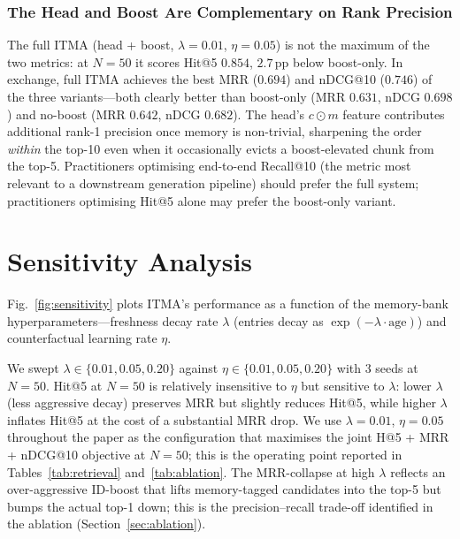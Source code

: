 \documentclass[journal]{IEEEtran}
\begin{document}
\subsubsection{The Head and Boost Are Complementary on Rank Precision}
The full ITMA (head + boost, $\lambda{=}0.01$, $\eta{=}0.05$) is not
the maximum of the two metrics: at $N{=}50$ it scores Hit@5 $0.854$,
$2.7$\,pp below boost-only.  In exchange, full ITMA achieves the best
MRR ($0.694$) and nDCG@10 ($0.746$) of the three variants---both
clearly better than boost-only (MRR $0.631$, nDCG $0.698$) and no-boost
(MRR $0.642$, nDCG $0.682$).  The head's $c{\odot}m$ feature
contributes additional rank-1 precision once memory is non-trivial,
sharpening the order \emph{within} the top-10 even when it occasionally
evicts a boost-elevated chunk from the top-5.  Practitioners optimising
end-to-end Recall@10 (the metric most relevant to a downstream
generation pipeline) should prefer the full system; practitioners
optimising Hit@5 alone may prefer the boost-only variant.

\section{Sensitivity Analysis}
\label{sec:sensitivity}

Fig.~\ref{fig:sensitivity} plots ITMA's performance as a function of
the memory-bank hyperparameters---freshness decay rate $\lambda$
(entries decay as $\exp(-\lambda \cdot \text{age})$) and counterfactual
learning rate $\eta$.

We swept $\lambda \in \{0.01, 0.05, 0.20\}$ against
$\eta \in \{0.01, 0.05, 0.20\}$ with 3 seeds at $N{=}50$.  Hit@5 at
$N{=}50$ is relatively insensitive to $\eta$ but sensitive to
$\lambda$: lower $\lambda$ (less aggressive decay) preserves MRR but
slightly reduces Hit@5, while higher $\lambda$ inflates Hit@5 at the
cost of a substantial MRR drop.  We use $\lambda=0.01$, $\eta=0.05$
throughout the paper as the configuration that maximises the joint
H@5 + MRR + nDCG@10 objective at $N{=}50$; this is the operating point
reported in Tables~\ref{tab:retrieval} and~\ref{tab:ablation}.  The
MRR-collapse at high $\lambda$ reflects an over-aggressive ID-boost
that lifts memory-tagged candidates into the top-5 but bumps the
actual top-1 down; this is the precision--recall trade-off identified
in the ablation (Section~\ref{sec:ablation}).

\end{document}
